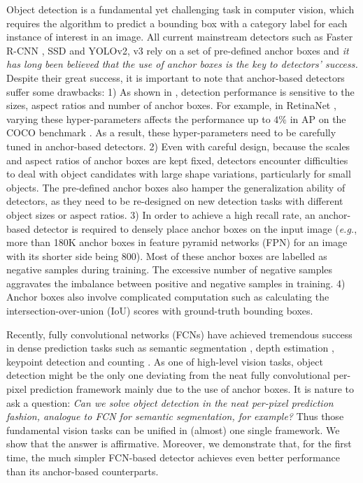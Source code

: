 \documentclass[10pt,twocolumn,letterpaper]{article}
\newcommand{\1}{{\mathbbm{1}}}           %
\def\eg{{\it e.g.}\xspace}
\begin{document}
Object detection is a fundamental yet 
%
challenging task
in computer vision, which requires the algorithm to predict a bounding box with a category label for each instance of interest in an image. All current mainstream detectors such as Faster R-CNN \cite{ren2015faster}, SSD \cite{liu2016ssd} and YOLOv2, v3 \cite{redmon2018yolov3} rely on a set of pre-defined anchor boxes and {\it it has long been believed  that 
the use of anchor boxes is  the key to detectors' success.}
%
%
%
Despite their great success, it is important to note that anchor-based detectors suffer some drawbacks:
1) As shown in \cite{lin2017focal, ren2015faster}, 
detection performance is sensitive to 
the sizes, aspect ratios and number of anchor boxes. 
%
For example, in RetinaNet \cite{lin2017focal}, varying these hyper-parameters affects the performance up to $4\%$ in AP on the COCO benchmark \cite{lin2014microsoft}. As a result, these hyper-parameters need to be carefully tuned  in  anchor-based detectors. 
2) Even with careful design, because
the scales and aspect ratios of anchor boxes are kept fixed, 
detectors encounter difficulties to deal with object candidates with large shape variations, particularly for small objects. The pre-defined anchor boxes also hamper 
the generalization ability of detectors, as they need to be re-designed on new detection tasks with different object sizes or aspect ratios.
3) In order to achieve a high recall rate, an anchor-based detector is required to densely place anchor boxes on the input image (\eg, more than 180K anchor boxes in feature pyramid networks (FPN) \cite{lin2017feature} for an image with its shorter side being 800). Most of these anchor boxes are labelled as negative samples during training. The excessive  number of negative samples aggravates the imbalance between positive and negative samples in training.
4) Anchor boxes also involve complicated computation such as calculating the intersection-over-union (IoU) scores with ground-truth bounding boxes.

Recently, fully convolutional networks (FCNs) \cite{long2015fully} have achieved  
%
tremendous
success in dense prediction tasks such as semantic segmentation \cite{long2015fully, tian2019decoders, He_2019_CVPR, Liu_2019_CVPR}, depth estimation \cite{Depth2015Liu, Yin2019enforcing}, keypoint detection \cite{ICCV2017Chen} and counting \cite{boominathan2016crowdnet}. As one of high-level vision tasks, object detection might be the only one deviating from the neat fully convolutional per-pixel prediction framework mainly due to the use of anchor boxes.
%
It is nature to ask a question: {\it Can we solve object detection  
%
%
%
in the neat per-pixel prediction fashion, analogue to FCN for semantic segmentation, for example? 
} Thus those fundamental vision tasks can be unified in (almost) one single framework.
We show that the answer is affirmative. 
Moreover, we demonstrate that, for the first time, the much simpler FCN-based detector achieves even better performance than its anchor-based counterparts.
\end{document}

